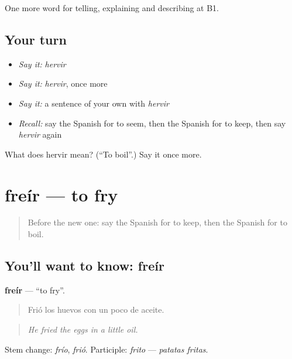 \begin{grammarlens}[title={What you've built}]
One more word for telling, explaining and describing at B1.
\end{grammarlens}

\subsection*{Your turn}
\begin{itemize}
\raggedright
  \item \emph{Say it:} \emph{hervir}
  \item \emph{Say it:} \emph{hervir}, once more
  \item \emph{Say it:} a sentence of your own with \emph{hervir}
  \item \emph{Recall:} say the Spanish for to seem, then the Spanish for to keep, then say \emph{hervir} again
\end{itemize}

\begin{tcolorbox}[breakable,colback=teal!4,colframe=teal!35!black,title={Before you move on}]
What does hervir mean? (\textquotedblleft{}To boil\textquotedblright{}.) Say it once more.
\end{tcolorbox}
\section[freír]{freír — to fry}

\label{lesson:ES-C768-freir}



\begin{quote}
Before the new one: say the Spanish for to keep, then the Spanish for to boil.
\end{quote}

\subsection*{You'll want to know: freír}
\textbf{freír} — \textquotedblleft{}to fry\textquotedblright{}.

\begin{quote}
Frió los huevos con un poco de aceite.
\end{quote}

\begin{quote}
\emph{He fried the eggs in a little oil.}
\end{quote}

Stem change: \emph{frío}, \emph{frió}. Participle: \emph{frito} — \emph{patatas fritas}.

